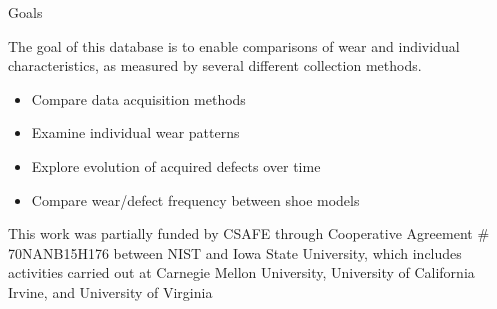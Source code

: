 \documentclass[landscape, a0paper, fontscale=0.275, margin = 30mm]{baposter} %
\newcommand{\headercolorbox}[4]{%
  \begin{posterbox}[#3,borderColor=#2,headerColorOne=#2,headerColorTwo=#2]{#1}
    #4
  \end{posterbox}
}
\newcommand\csafeboilerplate{\vspace*{0.05em}\hspace{-5mm}\tiny{This work was partially funded by CSAFE through Cooperative Agreement \# 70NANB15H176 between NIST and Iowa State University, which includes activities carried out at Carnegie Mellon University, University of California Irvine, and University of Virginia}}
\begin{document}
\begin{poster}
{}


\headercolorbox{Goals}{csafelightblue}{name=goals,column=2,span=1,below=baq,above=bottom}{
The goal of this database is to enable comparisons of wear and individual characteristics, as measured by several different collection methods.

\begin{itemize}\setlength\itemsep{3pt}
\item Compare data acquisition methods
\item Examine individual wear patterns
\item Explore evolution of acquired defects over time
\item Compare wear/defect frequency between shoe models
\end{itemize}
}
\end{poster}
\csafeboilerplate
\end{document}

